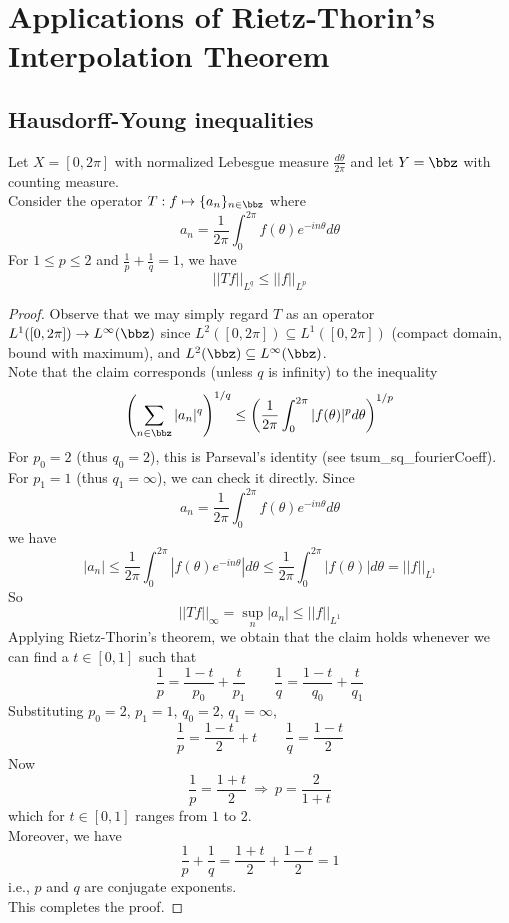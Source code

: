   \section{Applications of Rietz-Thorin's Interpolation Theorem}

  \subsection{Hausdorff-Young inequalities}

  \begin{lemma}
    \label{lem:hausdorff_young}
    Let $X=[0,2\pi]$ with normalized Lebesgue measure $\frac{d\theta}{2\pi}$ and let $Y=\bbz$ with counting measure.\\
    Consider the operator $T: f \mapsto \{a_n\}_{n\in \bbz}$ where
    \[ a_n = \frac{1}{2\pi} \int_0^{2\pi} f(\theta) e^{-in\theta} d\theta \]
    For $1\leq p\leq 2$ and $\frac{1}{p}+\frac{1}{q}=1$, we have
    \[ ||Tf||_{L^q} \leq ||f||_{L^p} \]

    \end{lemma}
      \begin{proof}
      Observe that we may simply regard $T$ as an operator $L^1([0, 2\pi]) \to L^{\infty}(\bbz)$ since $L^2([0, 2\pi]) \subseteq L^1([0, 2\pi])$ (compact domain, bound with maximum), and $L^2(\bbz) \subseteq L^{\infty}(\bbz)$.\\
      Note that the claim corresponds (unless $q$ is infinity) to the inequality
      \[ \left(\sum_{n \in \bbz} |a_n|^q \right)^{1/q} \leq \left(\frac{1}{2\pi} \int_0^{2\pi} |f(\theta)|^p d\theta\right)^{1/p}\]
      For $p_0=2$ (thus $q_0=2$), this is Parseval's identity (see tsum\_sq\_fourierCoeff).\\
      For $p_1=1$ (thus $q_1=\infty$), we can check it directly. Since
      \[ a_n = \frac{1}{2\pi} \int_0^{2\pi} f(\theta) e^{-in\theta} d\theta \]
      we have
      \[ |a_n| \leq \frac{1}{2\pi} \int_0^{2\pi} |f(\theta) e^{-in\theta}| d\theta \leq \frac{1}{2\pi} \int_0^{2\pi} |f(\theta)| d\theta = ||f||_{L^1}  \]
      So
      \[ ||Tf||_{\infty} = \sup_n |a_n| \leq ||f||_{L^1}\]
      Applying Rietz-Thorin's theorem, we obtain that the claim holds whenever we can find a $t\in [0,1]$ such that
      \[\frac{1}{p} = \frac{1-t}{p_0} + \frac{t}{p_1} \qquad \frac{1}{q} = \frac{1-t}{q_0} + \frac{t}{q_1} \]
      Substituting $p_0=2$, $p_1=1$, $q_0=2$, $q_1=\infty$,
      \[\frac{1}{p} = \frac{1-t}{2} + t \qquad \frac{1}{q} = \frac{1-t}{2} \]
      Now
      \[ \frac{1}{p} = \frac{1+t}{2} \ \Rightarrow \ p = \frac{2}{1+t} \]
      which for $t\in [0,1]$ ranges from $1$ to $2$.\\
      Moreover, we have
      \[ \frac{1}{p} + \frac{1}{q} = \frac{1+t}{2} + \frac{1-t}{2} = 1 \]
      i.e., $p$ and $q$ are conjugate exponents.\\
      This completes the proof.
    \end{proof}

